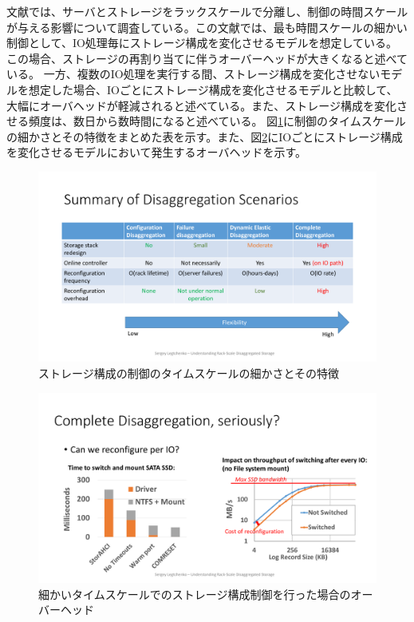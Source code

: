 \documentclass[a4j]{ujarticle}
\begin{document}
文献\cite{UnderstandingRackScaleDisaggregatedStorage}では、サーバとストレージをラックスケールで分離し、制御の時間スケールが与える影響について調査している。この文献では、最も時間スケールの細かい制御として、IO処理毎にストレージ構成を変化させるモデルを想定している。この場合、ストレージの再割り当てに伴うオーバーヘッドが大きくなると述べている。
一方、複数のIO処理を実行する間、ストレージ構成を変化させないモデルを想定した場合、IOごとにストレージ構成を変化させるモデルと比較して、大幅にオーバヘッドが軽減されると述べている。また、ストレージ構成を変化させる頻度は、数日から数時間になると述べている。
図\ref{disaggregated_time}に制御のタイムスケールの細かさとその特徴をまとめた表を示す。また、図\ref{disaggregated_overhead}にIOごとにストレージ構成を変化させるモデルにおいて発生するオーバヘッドを示す。
\begin{figure}[htbp]
  \centering
  \includegraphics[width=1.0\hsize]{disaggregated_time.pdf}
  \caption{ストレージ構成の制御のタイムスケールの細かさとその特徴}
  \label{disaggregated_time}
\end{figure}
\begin{figure}[htbp]
  \centering
  \includegraphics[width=1.0\hsize]{disaggregated_overhead.pdf}
  \caption{細かいタイムスケールでのストレージ構成制御を行った場合のオーバーヘッド}
  \label{disaggregated_overhead}
\end{figure}
\end{document}
